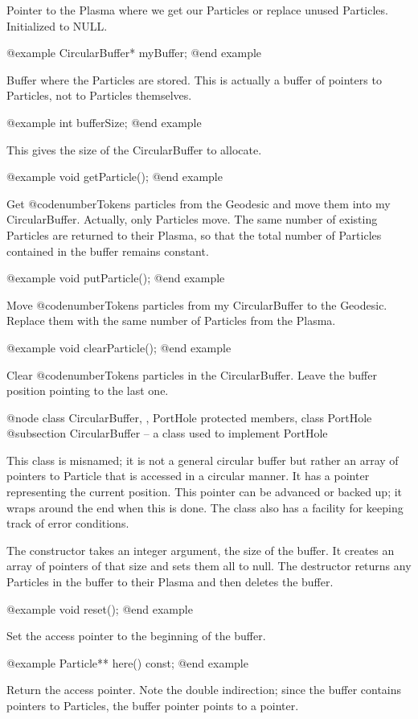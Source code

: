 Pointer to the Plasma where we get our Particles or replace unused
Particles.  Initialized to NULL.

@example
CircularBuffer* myBuffer;
@end example

Buffer where the Particles are stored.  This is actually a buffer of
pointers to Particles, not to Particles themselves.

@example
int bufferSize;
@end example

This gives the size of the CircularBuffer to allocate.

@example
void getParticle();
@end example

Get @code{numberTokens} particles from the Geodesic and move them into
my CircularBuffer.  Actually, only Particles move.  The same number of
existing Particles are returned to their Plasma, so that the total
number of Particles contained in the buffer remains constant.

@example
void putParticle();
@end example

Move @code{numberTokens} particles from my CircularBuffer to the
Geodesic.  Replace them with the same number of Particles from the Plasma.

@example
void clearParticle();
@end example

Clear @code{numberTokens} particles in the CircularBuffer.  Leave the
buffer position pointing to the last one.

@node class CircularBuffer,  , PortHole protected members, class PortHole
@subsection CircularBuffer -- a class used to implement PortHole

This class is misnamed; it is not a general circular buffer but
rather an array of pointers to Particle that is accessed in a
circular manner.  It has a pointer representing the current position.
This pointer can be advanced or backed up; it wraps around the end
when this is done.  The class also has a facility for keeping
track of error conditions.

The constructor takes an integer argument, the size of the buffer.
It creates an array of pointers of that size and sets them all to
null.  The destructor returns any Particles in the buffer to their
Plasma and then deletes the buffer.

@example
void reset();
@end example

Set the access pointer to the beginning of the buffer.

@example
Particle** here() const;
@end example

Return the access pointer.  Note the double indirection; since the
buffer contains pointers to Particles, the buffer pointer points
to a pointer.

